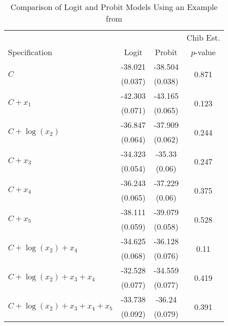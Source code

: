 \begin{table*}
\centering
\begin{tabular}{l|c|c|c}
   &  &  & Chib Est. \\ 
  Specification & Logit & Probit & $p$-value \\ 
   \hline
\hline
\multirow{2}{*}{$C$} & -38.021 & -38.504 & \multirow{2}{*}{0.871} \\ 
   & (0.037) & (0.038) &  \\ 
   \hline
\multirow{2}{*}{$C + x_1$} & -42.303 & -43.165 & \multirow{2}{*}{0.123} \\ 
   & (0.071) & (0.065) &  \\ 
   \hline
\multirow{2}{*}{$C + \log(x_2)$} & -36.847 & -37.909 & \multirow{2}{*}{0.244} \\ 
   & (0.064) & (0.062) &  \\ 
   \hline
\multirow{2}{*}{$C + x_3$} & -34.323 & -35.33 & \multirow{2}{*}{0.247} \\ 
   & (0.054) & (0.06) &  \\ 
   \hline
\multirow{2}{*}{$C + x_4$} & -36.243 & -37.229 & \multirow{2}{*}{0.375} \\ 
   & (0.065) & (0.06) &  \\ 
   \hline
\multirow{2}{*}{$C + x_5$} & -38.111 & -39.079 & \multirow{2}{*}{0.528} \\ 
   & (0.059) & (0.058) &  \\ 
   \hline
\multirow{2}{*}{$C + \log(x_2) + x_4$} & -34.625 & -36.128 & \multirow{2}{*}{0.11} \\ 
   & (0.068) & (0.076) &  \\ 
   \hline
\multirow{2}{*}{$C + \log(x_2) + x_3 + x_4$} & -32.528 & -34.559 & \multirow{2}{*}{0.419} \\ 
   & (0.077) & (0.077) &  \\ 
   \hline
\multirow{2}{*}{$C + \log(x_2) + x_3 + x_4 + x_5$} & -33.738 & -36.24 & \multirow{2}{*}{0.391} \\ 
   & (0.092) & (0.079) &  \\ 
   \hline
\end{tabular}
\caption{Comparison of Logit and Probit Models Using an Example from \cite{Chib}} 
\label{tab:Logit-Probit-Chib}
\end{table*}

